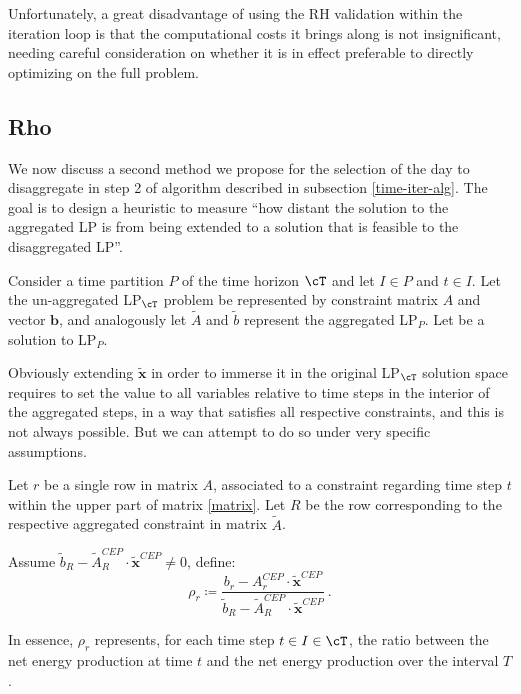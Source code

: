 \documentclass[smallextended,natbib]{svjour3}       %
\numberwithin{theorem}{section}
\begin{document}
Unfortunately, a great disadvantage of using the RH validation within the iteration loop is that the computational costs it brings along is not insignificant, needing careful consideration on whether it is in effect preferable to directly optimizing on the full problem.

\subsection{Rho}\label{subsection: rho}  

We now discuss a second method we propose for the selection of the day to disaggregate in step 2 of algorithm described in subsection \ref{time-iter-alg}. 
The goal is to design a heuristic to measure ``how distant the solution to the aggregated LP is from being extended to a solution that is feasible to the disaggregated LP''.

Consider a time partition $P$ of the time horizon $\cT$ and let \(I \in P\) and \(t \in I\).
Let the un-aggregated LP$_{\cT}$ problem be represented by constraint matrix $A$ and vector $\mathbf{b}$, and analogously let $\tilde{A}$ and $\tilde{b}$ represent the aggregated LP$_P$.
Let  be a solution to LP$_P$.

Obviously extending \(\tilde{\mathbf{x}}\) in order to immerse it in the original LP{$_\cT$} solution space requires to set the value to all variables relative to time steps in the interior of the aggregated steps, in a way that satisfies all respective constraints, and this is not always possible.
But we can attempt to do so under very specific assumptions. %

\begin{definition}[Rho]\label{def rho}
Let $r$ be a single row in matrix $A$, associated to a constraint regarding time step $t$ within the upper part of matrix \ref{matrix}. 
Let $R$ be the row corresponding to the respective aggregated constraint in matrix $\tilde{A}$.

Assume \(\tilde{b}_R - \tilde{A}_R^{CEP}\cdot \tilde{\mathbf{x}}^{CEP} \neq 0\), define:
\[\rho_r \coloneqq \frac{b_r - A_r^{CEP} \cdot \tilde{\mathbf{x}}^{CEP}}{\tilde{b}_R - \tilde{A}_R^{CEP}\cdot \tilde{\mathbf{x}}^{CEP}}\  .\]
\end{definition}
In essence, \(\rho_r\) represents, for each time step \(t \in I \in \cT\), the ratio between the net energy production at time \(t\) and the net energy production over the interval \(T\).
\end{document}

